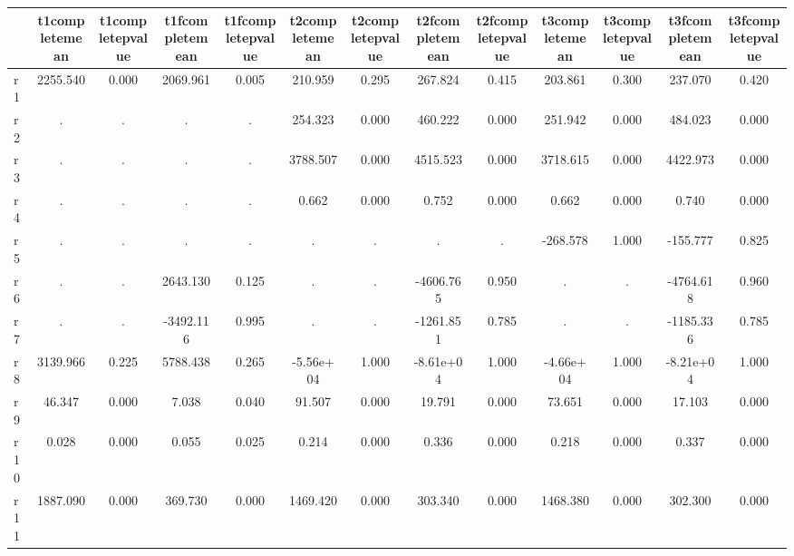 \begin{table}[htbp]
\begin{tabular}{lcccccccccccc} \hline \hline
 & t1completemean  & t1completepvalue  & t1fcompletemean  & t1fcompletepvalue  & t2completemean  & t2completepvalue  & t2fcompletemean  & t2fcompletepvalue  & t3completemean  & t3completepvalue  & t3fcompletemean  & t3fcompletepvalue  \\  \hline 
r1 &  2255.540 &     0.000 &  2069.961 &     0.005 &   210.959 &     0.295 &   267.824 &     0.415 &   203.861 &     0.300 &   237.070 &     0.420 \\  
r2 &         . &         . &         . &         . &   254.323 &     0.000 &   460.222 &     0.000 &   251.942 &     0.000 &   484.023 &     0.000 \\  
r3 &         . &         . &         . &         . &  3788.507 &     0.000 &  4515.523 &     0.000 &  3718.615 &     0.000 &  4422.973 &     0.000 \\  
r4 &         . &         . &         . &         . &     0.662 &     0.000 &     0.752 &     0.000 &     0.662 &     0.000 &     0.740 &     0.000 \\  
r5 &         . &         . &         . &         . &         . &         . &         . &         . &  -268.578 &     1.000 &  -155.777 &     0.825 \\  
r6 &         . &         . &  2643.130 &     0.125 &         . &         . & -4606.765 &     0.950 &         . &         . & -4764.618 &     0.960 \\  
r7 &         . &         . & -3492.116 &     0.995 &         . &         . & -1261.851 &     0.785 &         . &         . & -1185.336 &     0.785 \\  
r8 &  3139.966 &     0.225 &  5788.438 &     0.265 & -5.56e+04 &     1.000 & -8.61e+04 &     1.000 & -4.66e+04 &     1.000 & -8.21e+04 &     1.000 \\  
r9 &    46.347 &     0.000 &     7.038 &     0.040 &    91.507 &     0.000 &    19.791 &     0.000 &    73.651 &     0.000 &    17.103 &     0.000 \\  
r10 &     0.028 &     0.000 &     0.055 &     0.025 &     0.214 &     0.000 &     0.336 &     0.000 &     0.218 &     0.000 &     0.337 &     0.000 \\  
r11 &  1887.090 &     0.000 &   369.730 &     0.000 &  1469.420 &     0.000 &   303.340 &     0.000 &  1468.380 &     0.000 &   302.300 &     0.000 \\  
\hline \hline \end{tabular}
\end{table}
